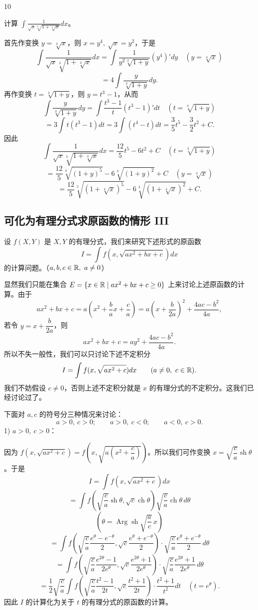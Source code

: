 \begin{sourceexample}{10}

	计算 \(\displaystyle\int\frac1{\sqrt{x}\sqrt[3]{1+\sqrt[4]{x}}}dx\)。

	首先作变换 \(y=\sqrt[4]{x}\)，则 \(x=y^4,\ \sqrt{x}=y^2\)，于是
	\[
	\int\frac1{\sqrt{x}\sqrt[3]{1+\sqrt[4]{x}}}dx=\int\frac1{y^2\sqrt[3]{1+y}}(y^4)'dy\quad(y=\sqrt[4]{x})
	\]
	\[
	=4\int\frac{y}{\sqrt[3]{1+y}}dy.
	\]
	再作变换 \(t=\sqrt[3]{1+y}\)，则 \(y=t^3-1\)，从而
	\[
	\int\frac{y}{\sqrt[3]{1+y}}dy=\int\frac{t^3-1}{t}(t^3-1)'dt\quad\left(t=\sqrt[3]{1+y}\right)
	\]
	\[
	=3\int t(t^3-1)dt=3\int(t^4-t)dt=\frac35t^5-\frac32t^2+C.
	\]
	因此
	\[
	\int\frac1{\sqrt{x}\sqrt[3]{1+\sqrt[4]{x}}}dx=\frac{12}{5}t^5-6t^2+C\quad\left(t=\sqrt[3]{1+y}\right)
	\]
	\[
	=\frac{12}{5}\sqrt[3]{(1+y)^5}-6\sqrt[3]{(1+y)^2}+C\quad(y=\sqrt[4]{x})
	\]
	\[
	=\frac{12}{5}\sqrt[3]{\left(1+\sqrt[4]{x}\right)^5}-6\sqrt[3]{\left(1+\sqrt[4]{x}\right)^2}+C.
	\]

\end{sourceexample}

\subsection{可化为有理分式求原函数的情形 III}

设 \(f(X,Y)\) 是 \(X,Y\) 的有理分式，我们来研究下述形式的原函数
\[
I=\int f\left(x,\sqrt{ax^2+bx+c}\right)dx
\]
的计算问题。（\(a,b,c\in\R,\ a\neq0\)）

显然我们只能在集合 \(E=\{x\in\mathbb{R}\mid ax^2+bx+c\ge0\}\) 上来讨论上述原函数的计算。由于
\[
ax^2+bx+c=a\left(x^2+\frac bax+\frac ca\right)=a\left(x+\frac b{2a}\right)^2+\frac{4ac-b^2}{4a},
\]
若令 \(y=x+\dfrac b{2a}\)，则
\[
ax^2+bx+c=ay^2+\frac{4ac-b^2}{4a}.
\]
所以不失一般性，我们可以只讨论下述不定积分
\[
I=\int f(x,\sqrt{ax^2+c})dx\qquad(a\neq0,\ c\in\R).
\]
我们不妨假设 \(c\neq0\)，否则上述不定积分就是 \(x\) 的有理分式的不定积分。这我们已经讨论过了。

下面对 \(a,c\) 的符号分三种情况来讨论：
\[
a>0,\ c>0;\qquad a>0,\ c<0;\qquad a<0,\ c>0.
\]
1) \(a>0,\ c>0\)：

因为 \(f(x,\sqrt{ax^2+c})=f\left(x,\sqrt{a\left(x^2+\dfrac ca\right)}\right)\)。所以我们可作变换 \(x=\sqrt{\dfrac ca}\operatorname{sh}\theta\)。于是
\[
I=\int f(x,\sqrt{ax^2+c})dx
\]
\[
=\int f\left(\sqrt{\frac ca}\operatorname{sh}\theta,\sqrt c\operatorname{ch}\theta\right)\sqrt{\frac ca}\operatorname{ch}\theta\,d\theta
\]
\[
\left(\theta=\operatorname{Arg}\operatorname{sh}\sqrt{\frac ac}\,x\right)
\]
\[
=\int f\left(\sqrt{\frac ca}\frac{e^\theta-e^{-\theta}}2,\sqrt c\frac{e^\theta+e^{-\theta}}2\right)\cdot\sqrt{\frac ca}\frac{e^\theta+e^{-\theta}}2\,d\theta
\]
\[
=\int f\left(\sqrt{\frac ca}\frac{e^{2\theta}-1}{2e^\theta},\sqrt c\frac{e^{2\theta}+1}{2e^\theta}\right)\cdot\sqrt{\frac ca}\frac{e^{2\theta}+1}{2e^\theta}\,d\theta
\]
\[
=\frac12\sqrt{\frac ca}\int f\left(\sqrt{\frac ca}\frac{t^2-1}{2t},\sqrt c\frac{t^2+1}{2t}\right)\cdot\frac{t^2+1}{t^2}dt\quad(t=e^\theta).
\]
因此 \(I\) 的计算化为关于 \(t\) 的有理分式的原函数的计算。

